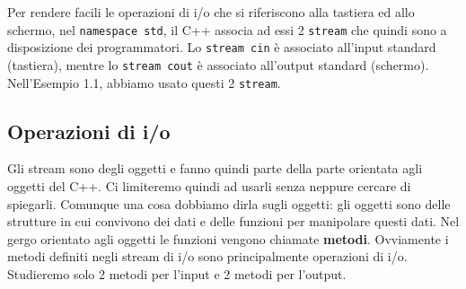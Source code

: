 \documentclass[a4paper,12pt]{book}
\begin{document}
Per rendere facili le operazioni di i/o che si riferiscono alla tastiera ed allo schermo, nel \texttt{namespace std}, il C++ associa ad essi 2 \texttt{stream} che quindi sono a disposizione dei programmatori. Lo \texttt{stream cin} è associato all'input standard (tastiera), mentre lo \texttt{stream cout} è associato all'output standard (schermo). Nell'Esempio 1.1, abbiamo usato questi 2 \texttt{stream}. 

\subsection{Operazioni di i/o}
Gli stream sono degli oggetti e fanno quindi parte della parte orientata agli oggetti del C++. Ci limiteremo quindi ad usarli senza neppure cercare di spiegarli. Comunque una cosa dobbiamo dirla sugli oggetti: gli oggetti sono delle strutture in cui convivono dei dati e delle funzioni per manipolare questi dati. Nel gergo orientato agli oggetti le funzioni vengono chiamate \textbf{metodi}. Ovviamente i metodi definiti negli stream di i/o sono principalmente operazioni di i/o. Studieremo solo 2 metodi per l'input e 2 metodi per l'output.
\end{document}
